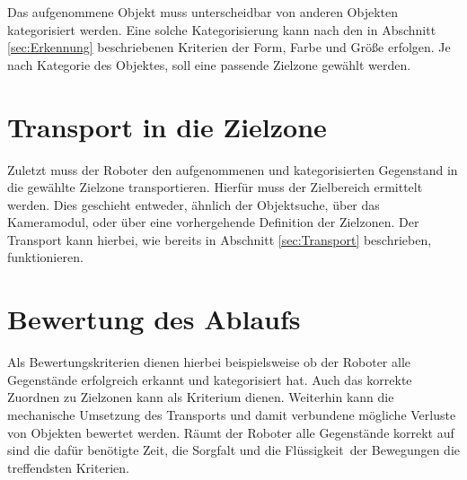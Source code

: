 Das aufgenommene Objekt muss unterscheidbar von anderen Objekten kategorisiert werden. Eine solche Kategorisierung kann nach den in Abschnitt \ref{sec:Erkennung} beschriebenen Kriterien der Form, Farbe und Größe erfolgen. Je nach Kategorie des Objektes, soll eine passende Zielzone gewählt werden.

\section{Transport in die Zielzone}

Zuletzt muss der Roboter den aufgenommenen und kategorisierten Gegenstand in die gewählte Zielzone transportieren. Hierfür muss der Zielbereich ermittelt werden. Dies geschieht entweder, ähnlich der Objektsuche, über das Kameramodul, oder über eine vorhergehende Definition der Zielzonen. Der Transport kann hierbei, wie bereits in Abschnitt \ref{sec:Transport} beschrieben, funktionieren. 

\section{Bewertung des Ablaufs}
\label{sec:Bewertung}

Als Bewertungskriterien dienen hierbei beispielsweise ob der Roboter alle Gegenstände erfolgreich erkannt und kategorisiert hat. Auch das korrekte Zuordnen zu Zielzonen kann als Kriterium dienen. Weiterhin kann die mechanische Umsetzung des Transports und damit verbundene mögliche Verluste von Objekten bewertet werden. Räumt der Roboter alle Gegenstände korrekt auf sind die dafür benötigte Zeit, die Sorgfalt und die \glqq Flüssigkeit\grqq\ der Bewegungen die treffendsten Kriterien.
